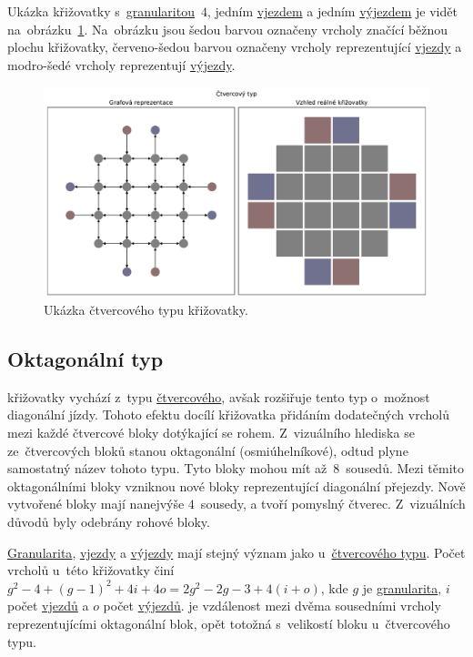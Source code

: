 Ukázka křižovatky s~\hyperref[par:granularita]{granularitou}~$4$, jedním \hyperref[par:vjezdy]{vjezdem} a
jedním \hyperref[par:vyjezdy]{výjezdem} je vidět na~obrázku~\ref{fig:square_type_graph}.
Na~obrázku jsou šedou barvou označeny vrcholy značící běžnou plochu křižovatky,
červeno-šedou barvou označeny vrcholy reprezentující \hyperref[par:vjezdy]{vjezdy} a
modro-šedé vrcholy reprezentují \hyperref[par:vyjezdy]{výjezdy}.

\begin{figure}[h]
  \centering
  \includegraphics[width=\textwidth]{../img/Square_grid}
  \caption{Ukázka čtvercového typu křižovatky.}
  \label{fig:square_type_graph}
\end{figure}

\subsection{Oktagonální typ}\label{subsec:oktagonalni_typ}

 křižovatky vychází z~typu \hyperref[subsec:ctvercovy_typ]{čtvercového},
avšak rozšiřuje tento typ o~možnost diagonální jízdy.
Tohoto efektu docílí křižovatka přidáním dodatečných vrcholů mezi každé čtvercové bloky dotýkající se rohem.
Z~vizuálního hlediska se ze~čtvercových bloků stanou oktagonální (osmiúhelníkové),
odtud plyne samostatný název tohoto typu.
Tyto bloky mohou mít až~$8$~sousedů.
Mezi těmito oktagonálními bloky vzniknou nové bloky reprezentující diagonální přejezdy.
Nově vytvořené bloky mají nanejvýše $4$~sousedy, a tvoří pomyslný čtverec.
Z~vizuálních důvodů byly odebrány rohové bloky.

\hyperref[par:granularita]{Granularita}, \hyperref[par:vjezdy]{vjezdy} a \hyperref[par:vyjezdy]{výjezdy}
mají stejný význam jako u~\hyperref[subsec:ctvercovy_typ]{čtvercového typu}.
Počet vrcholů u~této křižovatky činí $g^2 - 4 + (g-1)^2 + 4i + 4o = 2g^2 - 2g - 3 + 4(i + o)$,
kde $g$ je \hyperref[par:granularita]{granularita},
$i$ počet \hyperref[par:vjezdy]{vjezdů} a $o$ počet \hyperref[par:vyjezdy]{výjezdů}.
 je vzdálenost mezi dvěma sousedními vrcholy reprezentujícími oktagonální blok,
opět totožná s~velikostí bloku u~čtvercového typu.

